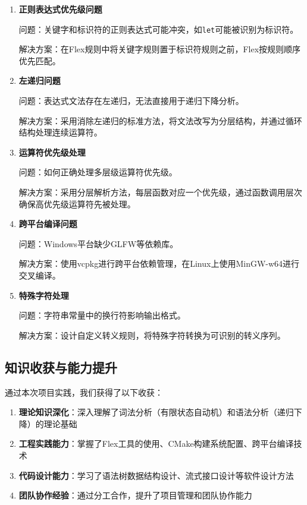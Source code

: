 \documentclass[12pt,a4paper]{ctexart}
\begin{document}
\begin{enumerate}
    \item \textbf{正则表达式优先级问题}

    问题：关键字和标识符的正则表达式可能冲突，如\texttt{let}可能被识别为标识符。

    解决方案：在Flex规则中将关键字规则置于标识符规则之前，Flex按规则顺序优先匹配。

    \item \textbf{左递归问题}

    问题：表达式文法存在左递归，无法直接用于递归下降分析。

    解决方案：采用消除左递归的标准方法，将文法改写为分层结构，并通过循环结构处理连续运算符。

    \item \textbf{运算符优先级处理}

    问题：如何正确处理多层级运算符优先级。

    解决方案：采用分层解析方法，每层函数对应一个优先级，通过函数调用层次确保高优先级运算符先被处理。

    \item \textbf{跨平台编译问题}

    问题：Windows平台缺少GLFW等依赖库。

    解决方案：使用vcpkg进行跨平台依赖管理，在Linux上使用MinGW-w64进行交叉编译。

    \item \textbf{特殊字符处理}

    问题：字符串常量中的换行符影响输出格式。

    解决方案：设计自定义转义规则，将特殊字符转换为可识别的转义序列。
\end{enumerate}

\subsection{知识收获与能力提升}

通过本次项目实践，我们获得了以下收获：

\begin{enumerate}
    \item \textbf{理论知识深化}：深入理解了词法分析（有限状态自动机）和语法分析（递归下降）的理论基础
    \item \textbf{工程实践能力}：掌握了Flex工具的使用、CMake构建系统配置、跨平台编译技术
    \item \textbf{代码设计能力}：学习了语法树数据结构设计、流式接口设计等软件设计方法
    \item \textbf{团队协作经验}：通过分工合作，提升了项目管理和团队协作能力
\end{enumerate}
\end{document}
